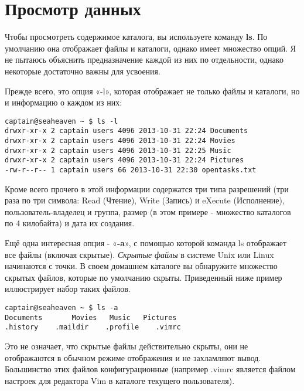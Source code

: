 \documentclass[12pt]{book}
\begin{document}
\section{Просмотр данных}

Чтобы просмотреть содержимое каталога, вы используете команду \textbf{ls}. По умолчанию она отображает файлы и каталоги, однако имеет множество опций. Я не пытаюсь объяснить предназначение каждой из них по отдельности, однако некоторые достаточно важны для усвоения.

Прежде всего, это опция «-l», которая отображает не только файлы и каталоги, но и информацию о каждом из них:

\vspace{3mm}
\begin{tcolorbox}
\begin{lstlisting}
captain@seaheaven ~ $ ls -l
drwxr-xr-x 2 captain users 4096 2013-10-31 22:24 Documents
drwxr-xr-x 2 captain users 4096 2013-10-31 22:24 Movies
drwxr-xr-x 2 captain users 4096 2013-10-31 22:25 Music
drwxr-xr-x 2 captain users 4096 2013-10-31 22:24 Pictures
-rw-r--r-- 1 captain users 66 2013-10-31 22:30 opentasks.txt
\end{lstlisting}
\end{tcolorbox}

Кроме всего прочего в этой информации содержатся три типа разрешений (три раза по три символа: Read (Чтение), Write (Запись) и eXecute (Исполнение), пользо\-ватель-владелец и группа, размер (в этом примере - множество каталогов по 4 килобайта) и дата их создания.

Ещё одна интересная опция - «\textbf{-a}», с помощью которой команда ls отображает все файлы (включая скрытые). \emph{Скрытые файлы} в системе Unix или Linux начинаются с точки. В своем домашнем каталоге вы обнаружите множество скрытых файлов, которые по умолчанию скрыты. Приведенный ниже пример иллюстрирует набор таких файлов.

\vspace{3mm}
\begin{tcolorbox}
\begin{lstlisting}
captain@seaheaven ~ $ ls -a
Documents 		Movies	 Music	 Pictures
.history 	.maildir 	.profile 	.vimrc
\end{lstlisting}
\end{tcolorbox}

Это не означает, что скрытые файлы действительно скрыты, они не отображаются в обычном режиме отображения и не захламляют вывод. Большинство этих файлов конфигурационные (например .vimrc является файлом настроек для редактора Vim в каталоге текущего пользователя). 
\end{document}
